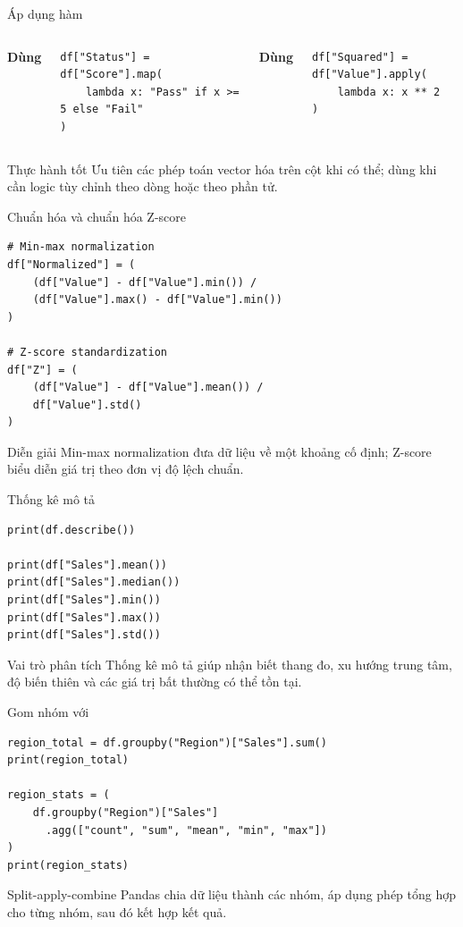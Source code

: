 \documentclass[aspectratio=169,11pt]{beamer}
\newcommand{\cmd}[1]{\texttt{\detokenize{#1}}}
\begin{document}
\begin{frame}[fragile]{Áp dụng hàm}
\small
\begin{columns}[T]
\textbf{Dùng \cmd{map()}}
\begin{lstlisting}[style=py]
df["Status"] = df["Score"].map(
    lambda x: "Pass" if x >= 5 else "Fail"
)
\end{lstlisting}
\textbf{Dùng \cmd{apply()}}
\begin{lstlisting}[style=py]
df["Squared"] = df["Value"].apply(
    lambda x: x ** 2
)
\end{lstlisting}
\end{columns}
\begin{alertblock}{Thực hành tốt}
Ưu tiên các phép toán vector hóa trên cột khi có thể; dùng \cmd{apply()} khi cần logic tùy chỉnh theo dòng hoặc theo phần tử.
\end{alertblock}
\end{frame}

\begin{frame}[fragile]{Chuẩn hóa và chuẩn hóa Z-score}
\small
\begin{lstlisting}[style=py]
# Min-max normalization
df["Normalized"] = (
    (df["Value"] - df["Value"].min()) /
    (df["Value"].max() - df["Value"].min())
)

# Z-score standardization
df["Z"] = (
    (df["Value"] - df["Value"].mean()) /
    df["Value"].std()
)
\end{lstlisting}
\begin{block}{Diễn giải}
Min-max normalization đưa dữ liệu về một khoảng cố định; Z-score biểu diễn giá trị theo đơn vị độ lệch chuẩn.
\end{block}
\end{frame}

\begin{frame}[fragile]{Thống kê mô tả}
\small
\begin{lstlisting}[style=py]
print(df.describe())

print(df["Sales"].mean())
print(df["Sales"].median())
print(df["Sales"].min())
print(df["Sales"].max())
print(df["Sales"].std())
\end{lstlisting}
\begin{block}{Vai trò phân tích}
Thống kê mô tả giúp nhận biết thang đo, xu hướng trung tâm, độ biến thiên và các giá trị bất thường có thể tồn tại.
\end{block}
\end{frame}

\begin{frame}[fragile]{Gom nhóm với \cmd{groupby()}}
\small
\begin{lstlisting}[style=py]
region_total = df.groupby("Region")["Sales"].sum()
print(region_total)

region_stats = (
    df.groupby("Region")["Sales"]
      .agg(["count", "sum", "mean", "min", "max"])
)
print(region_stats)
\end{lstlisting}
\begin{block}{Split-apply-combine}
Pandas chia dữ liệu thành các nhóm, áp dụng phép tổng hợp cho từng nhóm, sau đó kết hợp kết quả.
\end{block}
\end{frame}
\end{document}
